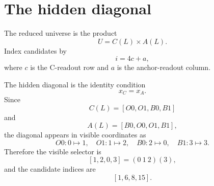 \section{The hidden diagonal}

The reduced universe is the product
\[
    U = C(L)\times A(L).
\]
Index candidates by
\[
    i = 4c+a,
\]
where \(c\) is the C-readout row and \(a\) is the anchor-readout column.

The hidden diagonal is the identity condition
\[
    x_C = x_A.
\]
Since
\[
    C(L)=[O0,O1,B0,B1]
\]
and
\[
    A(L)=[B0,O0,O1,B1],
\]
the diagonal appears in visible coordinates as
\[
    O0: 0\mapsto 1,\quad
    O1: 1\mapsto 2,\quad
    B0: 2\mapsto 0,\quad
    B1: 3\mapsto 3.
\]
Therefore the visible selector is
\[
    [1,2,0,3]=(0\ 1\ 2)(3),
\]
and the candidate indices are
\[
    [1,6,8,15].
\]
